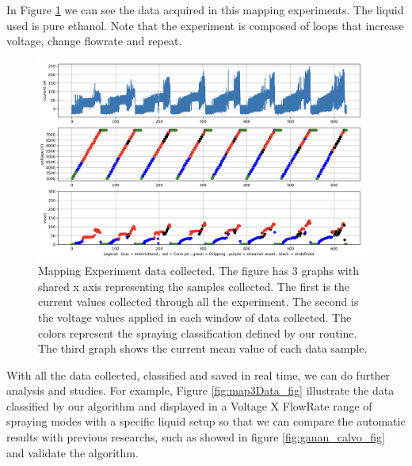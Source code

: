     In Figure \ref{fig:map2Data_fig} we can see the data acquired in this mapping experiments. The liquid used is pure ethanol. 
    Note that the experiment is composed of loops that increase voltage, change flowrate and repeat.


    \begin{figure}[H]
        \center
        \includegraphics[width=15cm]{Figuras/report2/map2Data.png}
        \caption{Mapping Experiment data collected. The figure has 3 graphs with shared x axis representing the samples collected. The first is the current values collected through all the experiment.
        The second is the voltage values applied in each window of data collected. The colors represent the spraying classification defined by our routine.
        The third graph shows the current mean value of each data sample.}
        \label{fig:map2Data_fig}
    \end{figure}

    With all the data collected, classified and saved in real time, we can do further analysis and studies. For example, Figure \ref{fig:map3Data_fig} illustrate the data classified by our algorithm and displayed in a Voltage X FlowRate range of spraying modes with a specific liquid setup so that we can compare the automatic results with previous researchs, such as showed in figure \ref{fig:ganan_calvo_fig} and validate the algorithm.

